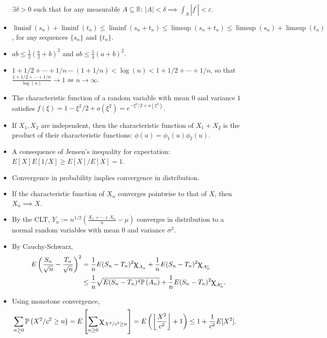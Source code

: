 \documentclass[12pt,reqno]{article}
\theoremstyle{plain}
\theoremstyle{definition}
\newcommand{\PP}[1]{\ensuremath{\mathbb{P}\left(#1\right)}}
\renewcommand{\chi}{\scalebox{1.25}{$\upchi$}}
\begin{document}
\begin{itemize}
     $\exists \delta > 0$ such that for any 
     measurable $A \subseteq \mathbb{R}$: 
     $|A| < \delta \implies \int_A |f^{\prime}| < \varepsilon$. 
\item $\liminf(s_n)+\liminf(t_n) \leq \liminf(s_n+t_n) \leq \limsup(s_n+t_n) \leq 
     \limsup(s_n) + \limsup(t_n)$, for any sequences $\{s_n\}$ and $\{t_n\}$. 
\item $ab \leq \frac{1}{2}\left(\frac{a}{2} + b\right)^2$ and 
     $ab \leq \frac{1}{4} (a+b)^2$. 
\item $1+1/2+\cdots+1/n -(1+1/n) < \log(n) < 1+1/2+\cdots+1/n$, so that 
     $\frac{1+1/2+\cdots+1/n}{\log(n)} \rightarrow 1$ as 
     $n \rightarrow \infty$. 
\item The characteristic function of a random variable with mean $0$ and 
     variance $1$ satisfies 
     $f(\xi) = 1-\xi^2/2+o(\xi^2) = e^{-\xi^2/2+o(\xi^2)}$. 
\item If $X_1,X_2$ are independent, then the characteristic function of 
     $X_1+X_2$ is the product of their characteristic functions: 
     $\phi(u) = \phi_1(u) \phi_2(u)$. 
\item A consequence of Jensen's inequality for expectation: 
     $E[X] E[1/X] \geq E[X] / E[X] = 1$. 
\item Convergence in probability implies convergence in distribution. 
\item If the characteristic function of $X_n$ converges pointwise to that of 
     $X$, then $X_n \implies X$. 
\item By the CLT, $Y_n := n^{1/2}\left(\frac{X_1+\cdots+X_n}{n} - \mu\right)$ 
      converges in distribution to a normal random variables with mean $0$ and 
      variance $\sigma^2$. 
\item By Cauchy-Schwarz, 
      \begin{align*} 
      E\left(\frac{S_n}{\sqrt{n}}-\frac{T_n}{\sqrt{n}}\right)^2 & = 
           \frac{1}{n} E(S_n-T_n)^2\chi_{A_n} + 
           \frac{1}{n} E(S_n-T_n)^2\chi_{A_n^{c}} \\ 
           & \leq \frac{1}{n} \sqrt{E(S_n-T_n)^4 \PP{A_n}} + 
           \frac{1}{n} E(S_n-T_n)^2\chi_{A_n^{c}}. 
      \end{align*} 
\item Using monotone convergence, 
      \begin{align*} 
      \sum_{n \geq 0} \PP{X^2 / c^2 \geq n} & = E\left[\sum_{n \geq 0} 
           \chi_{X^2/c^2 \geq n}\right] 
           = E\left(\left\lfloor\frac{X^2}{c^2}\right\rfloor + 1\right) 
           \leq 1 + \frac{1}{c^2} E[X^2]. 

\end{align*}
\end{itemize}
\end{document}
